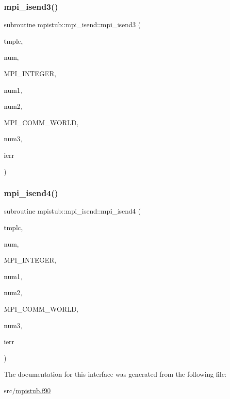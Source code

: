 \subsubsection{\texorpdfstring{mpi\_isend3()}{mpi\_isend3()}}
{\footnotesize\ttfamily subroutine mpistub\+::mpi\+\_\+isend\+::mpi\+\_\+isend3 (\begin{DoxyParamCaption}\item[{integer, dimension(\+:)}]{tmplc,  }\item[{}]{num,  }\item[{}]{M\+P\+I\+\_\+\+I\+N\+T\+E\+G\+ER,  }\item[{}]{num1,  }\item[{}]{num2,  }\item[{}]{M\+P\+I\+\_\+\+C\+O\+M\+M\+\_\+\+W\+O\+R\+LD,  }\item[{}]{num3,  }\item[{}]{ierr }\end{DoxyParamCaption})}

\mbox{\label{interfacempistub_1_1mpi__isend_af131acae622a106a363ddec117288f37}} 
\subsubsection{\texorpdfstring{mpi\_isend4()}{mpi\_isend4()}}
{\footnotesize\ttfamily subroutine mpistub\+::mpi\+\_\+isend\+::mpi\+\_\+isend4 (\begin{DoxyParamCaption}\item[{integer}]{tmplc,  }\item[{}]{num,  }\item[{}]{M\+P\+I\+\_\+\+I\+N\+T\+E\+G\+ER,  }\item[{}]{num1,  }\item[{}]{num2,  }\item[{}]{M\+P\+I\+\_\+\+C\+O\+M\+M\+\_\+\+W\+O\+R\+LD,  }\item[{}]{num3,  }\item[{}]{ierr }\end{DoxyParamCaption})}



The documentation for this interface was generated from the following file\+:\begin{DoxyCompactItemize}
\item 
src/\mbox{\hyperlink{mpistub_8f90}{mpistub.\+f90}}\end{DoxyCompactItemize}
